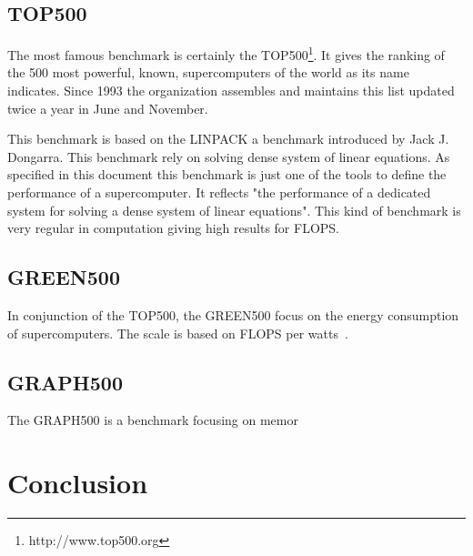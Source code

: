 \subsection{TOP500}
The most famous benchmark is certainly the TOP500\footnote{http://www.top500.org}. 
It gives the ranking of the 500 most powerful, known, supercomputers of the world as its name indicates.
Since 1993 the organization assembles and maintains this list updated twice a year in June and November.

This benchmark is based on the LINPACK\cite{dongarra1994top500} a benchmark introduced by Jack J. Dongarra.
This benchmark rely on solving  dense system of linear equations. 
As specified in this document this benchmark is just one of the tools to define the performance of a supercomputer. 
It reflects "the performance of a dedicated system for solving a dense system of linear equations".
This kind of benchmark is very regular in computation giving high results for FLOPS. 


\subsection{GREEN500}
In conjunction of the TOP500, the GREEN500 focus on the energy consumption of supercomputers. 
The scale is based on FLOPS per watts~\cite{feng2007green500}.

\subsection{GRAPH500}
The GRAPH500 is a benchmark focusing on memor




\section{Conclusion}


